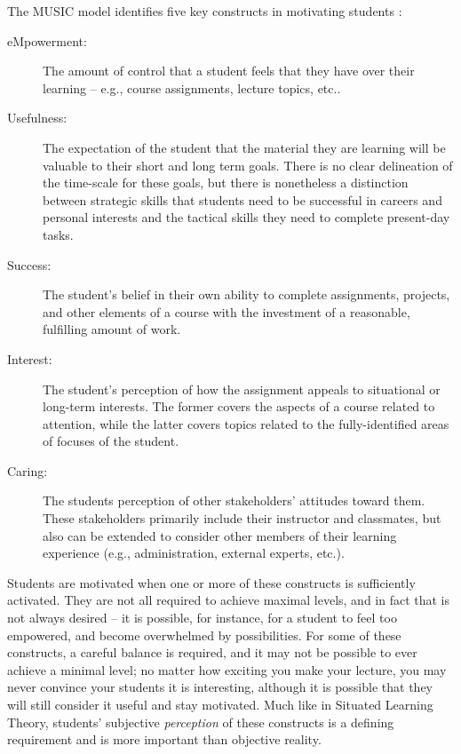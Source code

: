 The MUSIC model identifies five key constructs in motivating students \cite{jones-description}:
\begin{description}
	\item[eMpowerment:] The amount of control that a student feels that they have over their learning -- e.g., course assignments, lecture topics, etc..
	\item[Usefulness:] The expectation of the student that the material they are learning will be valuable to their short and long term goals. There is no clear delineation of the time-scale for these goals, but there is nonetheless a distinction between strategic skills that students need to be successful in careers and personal interests and the tactical skills they need to complete present-day tasks.
	\item[Success:] The student's belief in their own ability to complete assignments, projects, and other elements of a course with the investment of a reasonable, fulfilling amount of work.
	\item[Interest:] The student's perception of how the assignment appeals to situational or long-term interests. The former covers the aspects of a course related to attention, while the latter covers topics related to the fully-identified areas of focuses of the student.
	\item[Caring:] The students perception of other stakeholders' attitudes toward them. These stakeholders primarily include their instructor and classmates, but also can be extended to consider other members of their learning experience (e.g., administration, external experts, etc.).
\end{description}

Students are motivated when one or more of these constructs is sufficiently activated.
They are not all required to achieve maximal levels, and in fact that is not always desired -- it is possible, for instance, for a student to feel too empowered, and become overwhelmed by possibilities.
For some of these constructs, a careful balance is required, and it may not be possible to ever achieve a minimal level; no matter how exciting you make your lecture, you may never convince your students it is interesting, although it is possible that they will still consider it useful and stay motivated.
Much like in Situated Learning Theory, students' subjective \textit{perception} of these constructs is a defining requirement and is more important than objective reality.


